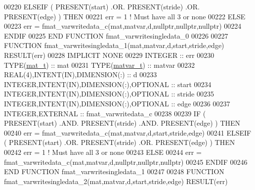 \begin{DoxyCode}
00220     \textcolor{keywordflow}{ELSEIF} ( \textcolor{keyword}{PRESENT}(start) .OR. \textcolor{keyword}{PRESENT}(stride) .OR. \textcolor{keyword}{PRESENT}(edge) ) \textcolor{keywordflow}{THEN}
00221         err = 1    \textcolor{comment}{! Must have all 3 or none}
00222     \textcolor{keywordflow}{ELSE}
00223         err = fmat\_varwritedata\_c(mat,matvar,d,nullptr,nullptr,nullptr)
00224 \textcolor{keywordflow}{    ENDIF}
00225 \textcolor{keyword}{END FUNCTION }fmat\_varwritesingledata\_0
00226 
00227 \textcolor{keyword}{FUNCTION }fmat\_varwritesingledata\_1(mat,matvar,d,start,stride,edge) \textcolor{keyword}{RESULT}(err)
00228 \textcolor{keywordtype}{IMPLICIT NONE}
00229     \textcolor{keywordtype}{INTEGER}                                  :: err
00230     \textcolor{keywordtype}{TYPE}(\hyperlink{group___m_a_t_gab0fc888f5a5d79943b16284b1f91c2e8}{mat\_t})                              :: mat
00231     \textcolor{keywordtype}{TYPE}(\hyperlink{group___m_a_t_structmatvar__t}{matvar\_t})                           :: matvar
00232     \textcolor{keywordtype}{REAL(4)},\textcolor{keywordtype}{INTENT(IN)},\textcolor{keywordtype}{DIMENSION(:)}          :: d
00233     \textcolor{keywordtype}{INTEGER},\textcolor{keywordtype}{INTENT(IN)},\textcolor{keywordtype}{DIMENSION(:)},\textcolor{keywordtype}{OPTIONAL} :: start
00234     \textcolor{keywordtype}{INTEGER},\textcolor{keywordtype}{INTENT(IN)},\textcolor{keywordtype}{DIMENSION(:)},\textcolor{keywordtype}{OPTIONAL} :: stride
00235     \textcolor{keywordtype}{INTEGER},\textcolor{keywordtype}{INTENT(IN)},\textcolor{keywordtype}{DIMENSION(:)},\textcolor{keywordtype}{OPTIONAL} :: edge
00236 
00237     \textcolor{keywordtype}{INTEGER},\textcolor{keywordtype}{EXTERNAL}                         :: fmat\_varwritedata\_c
00238 
00239     \textcolor{keywordflow}{IF} ( \textcolor{keyword}{PRESENT}(start) .AND. \textcolor{keyword}{PRESENT}(stride) .AND. \textcolor{keyword}{PRESENT}(edge) ) \textcolor{keywordflow}{THEN}
00240         err = fmat\_varwritedata\_c(mat,matvar,d,start,stride,edge)
00241     \textcolor{keywordflow}{ELSEIF} ( \textcolor{keyword}{PRESENT}(start) .OR. \textcolor{keyword}{PRESENT}(stride) .OR. \textcolor{keyword}{PRESENT}(edge) ) \textcolor{keywordflow}{THEN}
00242         err = 1    \textcolor{comment}{! Must have all 3 or none}
00243     \textcolor{keywordflow}{ELSE}
00244         err = fmat\_varwritedata\_c(mat,matvar,d,nullptr,nullptr,nullptr)
00245 \textcolor{keywordflow}{    ENDIF}
00246 \textcolor{keyword}{END FUNCTION }fmat\_varwritesingledata\_1
00247 
00248 \textcolor{keyword}{FUNCTION }fmat\_varwritesingledata\_2(mat,matvar,d,start,stride,edge) \textcolor{keyword}{RESULT}(err)

\end{DoxyCode}

